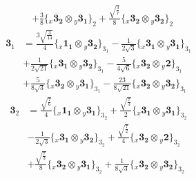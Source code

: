 \documentclass[english]{article}
\newcommand{\rep}[1]{\mathbf{#1}}
\newcommand{\repx}[2]{{}_{#2}\mathbf{#1}}
\newcommand{\tsprodx}[2]{\repx{#1}{x}\otimes\repx{#2}{y}}
\newcommand{\subcgs}[3]{\big\{ \tsprodx{#1}{#2}\big\}^{}_{#3}}
\begin{document}
\begin{itemize}
\begin{fleqn}
\begin{align*}
 & +\frac{3}{8}\subcgs{3_{2}}{3_{1}}{2}+\frac{\sqrt{\frac{3}{7}}}{8}\subcgs{3_{2}}{3_{2}}{2}
\end{align*}
\begin{align*}
\rep{3}_{1} & = \frac{3 \sqrt{\frac{3}{14}}}{4}\subcgs{1_{1}}{3_{2}}{3_{1}}-\frac{1}{2 \sqrt{3}}\subcgs{3_{1}}{3_{1}}{3_{1}} \\ 
 & +\frac{1}{2 \sqrt{21}}\subcgs{3_{1}}{3_{2}}{3_{1}}-\frac{5}{4 \sqrt{6}}\subcgs{3_{2}}{2}{3_{1}} \\ 
 & +\frac{5}{8 \sqrt{3}}\subcgs{3_{2}}{3_{1}}{3_{1}}-\frac{23}{8 \sqrt{21}}\subcgs{3_{2}}{3_{2}}{3_{1}}
\end{align*}
\begin{align*}
\rep{3}_{2} & = \frac{\sqrt{\frac{7}{6}}}{4}\subcgs{1_{1}}{3_{1}}{3_{2}}+\frac{\sqrt{\frac{7}{3}}}{2}\subcgs{3_{1}}{3_{1}}{3_{2}} \\ 
 & -\frac{1}{2 \sqrt{3}}\subcgs{3_{1}}{3_{2}}{3_{2}}+\frac{\sqrt{\frac{7}{2}}}{4}\subcgs{3_{2}}{2}{3_{2}} \\ 
 & +\frac{\sqrt{\frac{7}{3}}}{8}\subcgs{3_{2}}{3_{1}}{3_{2}}+\frac{1}{8 \sqrt{3}}\subcgs{3_{2}}{3_{2}}{3_{2}}
\end{align*}
\end{fleqn}
\end{itemize}
\end{document}
